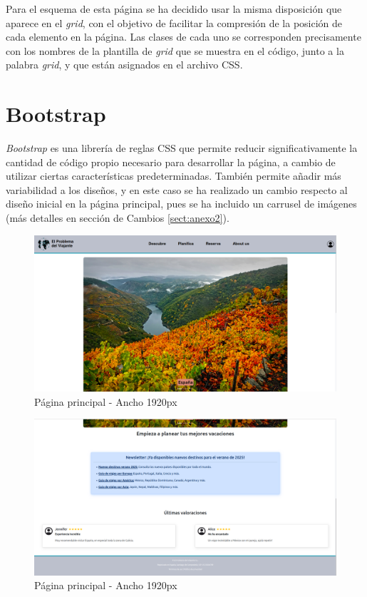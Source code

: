 \documentclass[11pt, a4paper]{book}
\begin{document}
	Para el esquema de esta página se ha decidido usar la misma disposición que aparece en el \textit{grid}, con el objetivo de facilitar la compresión de la posición de cada elemento en la página. Las clases de cada uno se corresponden precisamente con los nombres de la plantilla de \textit{grid} que se muestra en el código, junto a la palabra \textit{grid}, y que están asignados en el archivo CSS.

	
	\section{Bootstrap}
	\textit{Bootstrap} es una librería de reglas CSS que permite reducir significativamente la cantidad de código propio necesario para desarrollar la página, a cambio de utilizar ciertas características predeterminadas. También permite añadir más variabilidad a los diseños, y en este caso se ha realizado un cambio respecto al diseño inicial en la página principal, pues se ha incluido un carrusel de imágenes (más detalles en sección de Cambios \ref{sect:anexo2}).
	
	\begin{figure} [H]
		\centering
		\includegraphics[width=\textwidth]{CSS/1-1 1920.png}
		\caption{Página principal - Ancho 1920px}
	\end{figure}
	\begin{figure} [H]
		\centering
		\includegraphics[width=\textwidth]{CSS/1-2 1920.png}
		\caption{Página principal - Ancho 1920px}
	\end{figure}
\end{document}
